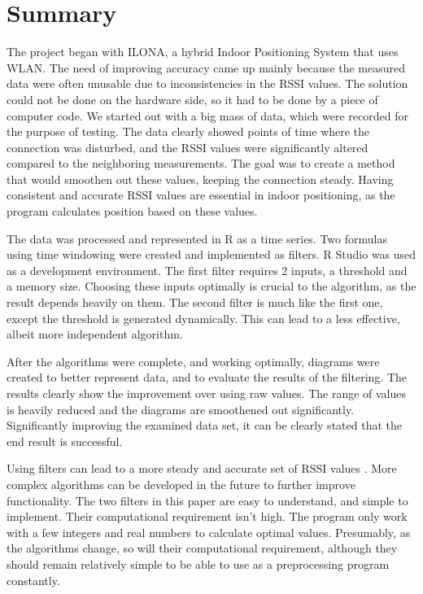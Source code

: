 \chapter{Summary}
\onehalfspacing
\label{chap:summary}
The project began with ILONA, a hybrid Indoor Positioning System that uses WLAN.
The need of improving accuracy came up mainly because the measured data were often unusable due to inconsistencies  in the RSSI values. The solution could not be done on the hardware side, so it had to be done by a piece of computer code.
We started out with a big mass of data, which were recorded for the purpose of testing.
The data clearly showed points of time where the connection was disturbed, and the RSSI values were significantly altered compared to the  neighboring measurements. The goal was to create a method that would smoothen out these values, keeping the connection steady. Having consistent and accurate RSSI values are essential in indoor positioning, as the program calculates position based on these values.


The data was processed and represented in R as a time series. Two formulas using time windowing were created and implemented as filters. R Studio was used as a development environment. The first filter requires 2 inputs, a threshold and a memory size. Choosing these inputs optimally  is crucial to the algorithm, as the result depends heavily on them.
The second filter is much like the first one, except the threshold is generated dynamically.
This can lead to a less effective, albeit more independent algorithm.

 After the algorithms were complete, and working optimally, diagrams were created to better represent data, and to evaluate the results of the filtering. The results clearly show the improvement over using raw values. The range of values is heavily reduced and the diagrams are smoothened out significantly. Significantly improving the examined data set, it can be clearly stated that the end result is successful.
 
 Using filters can lead to a more steady and accurate set of RSSI values . More complex algorithms can be developed in the future to further improve functionality. The two filters in this paper are easy to understand, and simple to implement. Their computational requirement isn't high. The program only work with a few integers and real numbers to calculate optimal values. Presumably, as the algorithms change, so will their computational requirement, although they should remain relatively simple to be able to use as a preprocessing program constantly.